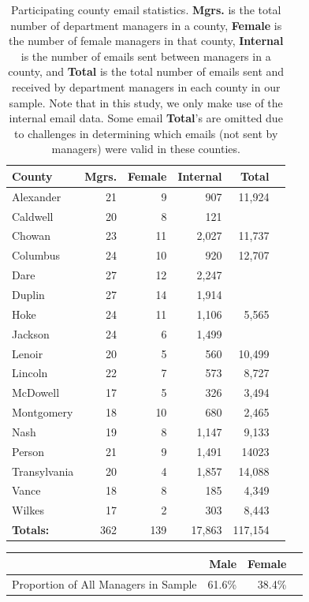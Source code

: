 \documentclass{pnastwo}
\begin{document}
\begin{article}
\begin{table}
	\begin{tabular}{lrrrrr}
	  \hline
	 \textbf{County} & \textbf{Mgrs.} & \textbf{Female} & \textbf{Internal} &\textbf{Total} \\
	  \hline
	Alexander & 21 & 9 & 907 & 11,924  \\
	Caldwell & 20 & 8 & 121 &    \\
	Chowan & 23 & 11 & 2,027 & 11,737  \\
	Columbus & 24 & 10 & 920 & 12,707  \\
	Dare & 27 & 12 & 2,247 &   \\
	Duplin & 27 & 14 & 1,914 &   \\
	Hoke & 24 & 11 & 1,106 & 5,565  \\
	Jackson & 24 & 6 & 1,499 &   \\
	Lenoir & 20 & 5 & 560 & 10,499 \\
	Lincoln & 22 & 7 & 573 & 8,727  \\
	McDowell & 17 & 5 & 326 & 3,494  \\
	Montgomery & 18 & 10 & 680 & 2,465  \\
	Nash & 19 & 8 & 1,147 & 9,133 \\
	Person & 21 & 9 & 1,491 & 14023  \\
	Transylvania & 20 & 4 & 1,857 & 14,088 \\
	Vance & 18 & 8 & 185 & 4,349  \\
	Wilkes & 17 & 2 & 303 & 8,443  \\
	   \hline
	   \textbf{Totals:} & 362 & 139 & 17,863 & 117,154  \\
	   \hline
	\end{tabular}
	\caption{\label{tab:county aggregate stats}Participating county email statistics. \textbf{Mgrs.} is the total number of department managers in a county, \textbf{Female} is the number of female managers in that county, \textbf{Internal} is the number of emails sent between managers in a county, and \textbf{Total} is the total number of emails sent and received by department managers in each county in our sample. Note that in this study, we only make use of the internal email data. Some email \textbf{Total}'s are omitted due to challenges in determining which emails (not sent by managers) were valid in these counties.}
\end{table}	
	

\begin{table}
	
	\begin{tabular}{m{2in}rrr}
	\toprule
& \textbf{Male} & \textbf{Female}  \\
	 \midrule
	 Proportion of All Managers in Sample & 61.6\%& 38.4\% \\


\end{tabular}
\end{table}
\end{article}
\end{document}
